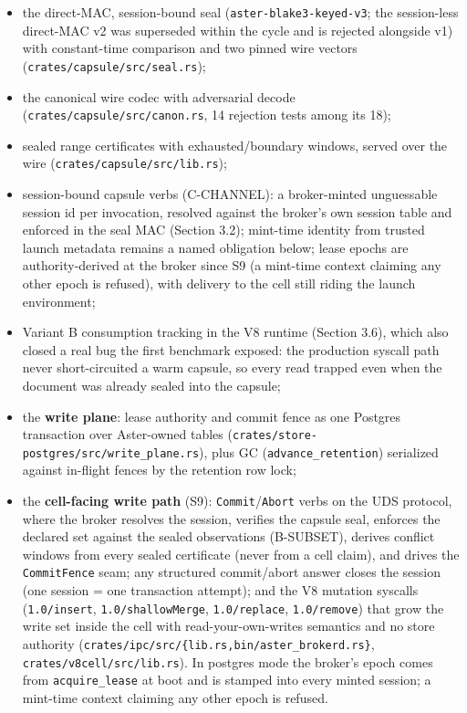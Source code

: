 \documentclass[
  11pt,
]{article}
\providecommand{\tightlist}{%
  \setlength{\itemsep}{0pt}\setlength{\parskip}{0pt}}
\begin{document}
\begin{itemize}
\tightlist
\item
  the direct-MAC, session-bound seal (\texttt{aster-blake3-keyed-v3}; the session-less direct-MAC v2 was superseded within the cycle and is rejected alongside v1) with constant-time comparison and two pinned wire vectors (\texttt{crates/capsule/src/seal.rs});
\item
  the canonical wire codec with adversarial decode (\texttt{crates/capsule/src/canon.rs}, 14 rejection tests among its 18);
\item
  sealed range certificates with exhausted/boundary windows, served over the wire (\texttt{crates/capsule/src/lib.rs});
\item
  session-bound capsule verbs (C-CHANNEL): a broker-minted unguessable session id per invocation, resolved against the broker's own session table and enforced in the seal MAC (Section 3.2); mint-time identity from trusted launch metadata remains a named obligation below; lease epochs are authority-derived at the broker since S9 (a mint-time context claiming any other epoch is refused), with delivery to the cell still riding the launch environment;
\item
  Variant B consumption tracking in the V8 runtime (Section 3.6), which also closed a real bug the first benchmark exposed: the production syscall path never short-circuited a warm capsule, so every read trapped even when the document was already sealed into the capsule;
\item
  the \textbf{write plane}: lease authority and commit fence as one Postgres transaction over Aster-owned tables (\texttt{crates/store-postgres/src/write\_plane.rs}), plus GC (\texttt{advance\_retention}) serialized against in-flight fences by the retention row lock;
\item
  the \textbf{cell-facing write path} (S9): \texttt{Commit}/\texttt{Abort} verbs on the UDS protocol, where the broker resolves the session, verifies the capsule seal, enforces the declared set against the sealed observations (B-SUBSET), derives conflict windows from every sealed certificate (never from a cell claim), and drives the \texttt{CommitFence} seam; any structured commit/abort answer closes the session (one session = one transaction attempt); and the V8 mutation syscalls (\texttt{1.0/insert}, \texttt{1.0/shallowMerge}, \texttt{1.0/replace}, \texttt{1.0/remove}) that grow the write set inside the cell with read-your-own-writes semantics and no store authority (\texttt{crates/ipc/src/\{lib.rs,bin/aster\_brokerd.rs\}}, \texttt{crates/v8cell/src/lib.rs}). In postgres mode the broker's epoch comes from \texttt{acquire\_lease} at boot and is stamped into every minted session; a mint-time context claiming any other epoch is refused.
\end{itemize}
\end{document}
